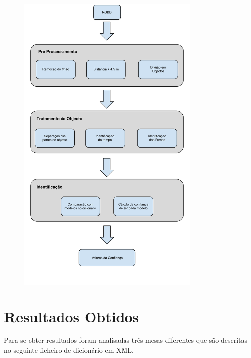 \begin{figure}[!htb]
	\begin{center}
	\includegraphics[width=0.80\textwidth]{figures/processo_identificacao.png}
		\label{fig:processamento}
	\end{center}
\end{figure}

\vspace*{12mm}




\section {Resultados Obtidos}

Para se obter resultados foram analisadas três mesas diferentes que são descritas no seguinte ficheiro de dicionário em XML. 

